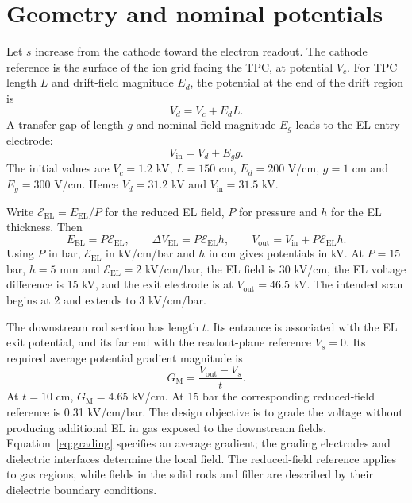 \documentclass[11pt,a4paper]{article}
\newcommand{\EP}{\mathcal{E}_{\mathrm{EL}}}
\newcommand{\gradV}{G_{\mathrm{M}}}
\begin{document}
\section{Geometry and nominal potentials}
Let $s$ increase from the cathode toward the electron readout. The cathode
reference is the surface of the ion grid facing the TPC, at potential $V_c$.
For TPC length $L$ and drift-field magnitude $E_d$, the potential at the end
of the drift region is
\begin{equation}
 V_d=V_c+E_d L.
\end{equation}
A transfer gap of length $g$ and nominal field magnitude $E_g$ leads to the
EL entry electrode:
\begin{equation}
 V_{\mathrm{in}}=V_d+E_g g.
\end{equation}
The initial values are $V_c=1.2$ kV, $L=150$ cm, $E_d=200$ V/cm,
$g=1$ cm and $E_g=300$ V/cm. Hence $V_d=31.2$ kV and
$V_{\mathrm{in}}=31.5$ kV.

Write $\EP=E_{\mathrm{EL}}/P$ for the reduced EL field, $P$ for pressure and
$h$ for the EL thickness. Then
\begin{equation}
 E_{\mathrm{EL}}=P\EP,\qquad
 \Delta V_{\mathrm{EL}}=P\EP h,\qquad
 V_{\mathrm{out}}=V_{\mathrm{in}}+P\EP h.
 \label{eq:el-potentials}
\end{equation}
Using $P$ in bar, $\EP$ in kV/cm/bar and $h$ in cm gives potentials in kV.
At $P=15$ bar, $h=5$ mm and $\EP=2$ kV/cm/bar, the EL field is
30 kV/cm, the EL voltage difference is 15 kV, and the exit electrode is at
$V_{\mathrm{out}}=46.5$ kV. The intended scan begins at 2 and extends to
3 kV/cm/bar.

The downstream rod section has length $t$. Its entrance is associated with
the EL exit potential, and its far end with the readout-plane reference
$V_s=0$. Its required average potential gradient magnitude is
\begin{equation}
 \gradV=\frac{V_{\mathrm{out}}-V_s}{t}.
 \label{eq:grading}
\end{equation}
At $t=10$ cm, $\gradV=4.65$ kV/cm. At 15 bar the corresponding reduced-field
reference is 0.31 kV/cm/bar. The design objective is to grade the voltage
without producing additional EL in gas exposed to the downstream fields.
Equation~\eqref{eq:grading} specifies an average gradient; the grading electrodes
and dielectric interfaces determine the local field. The reduced-field reference
applies to gas regions, while fields in the solid rods and filler are described
by their dielectric boundary conditions.
\end{document}

